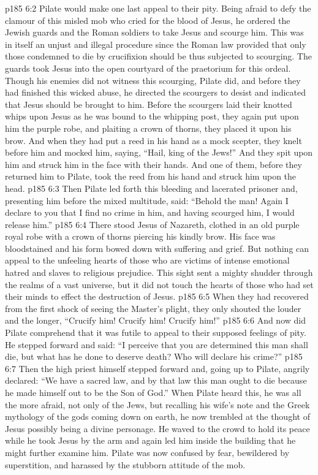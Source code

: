 \vs p185 6:2 Pilate would make one last appeal to their pity. Being afraid to defy the clamour of this misled mob who cried for the blood of Jesus, he ordered the Jewish guards and the Roman soldiers to take Jesus and scourge him. This was in itself an unjust and illegal procedure since the Roman law provided that only those condemned to die by crucifixion should be thus subjected to scourging. The guards took Jesus into the open courtyard of the praetorium for this ordeal. Though his enemies did not witness this scourging, Pilate did, and before they had finished this wicked abuse, he directed the scourgers to desist and indicated that Jesus should be brought to him. Before the scourgers laid their knotted whips upon Jesus as he was bound to the whipping post, they again put upon him the purple robe, and plaiting a crown of thorns, they placed it upon his brow. And when they had put a reed in his hand as a mock scepter, they knelt before him and mocked him, saying, “Hail, king of the Jews!” And they spit upon him and struck him in the face with their hands. And one of them, before they returned him to Pilate, took the reed from his hand and struck him upon the head.
\vs p185 6:3 Then Pilate led forth this bleeding and lacerated prisoner and, presenting him before the mixed multitude, said: “Behold the man! Again I declare to you that I find no crime in him, and having scourged him, I would release him.”
\vs p185 6:4 There stood Jesus of Nazareth, clothed in an old purple royal robe with a crown of thorns piercing his kindly brow. His face was bloodstained and his form bowed down with suffering and grief. But nothing can appeal to the unfeeling hearts of those who are victims of intense emotional hatred and slaves to religious prejudice. This sight sent a mighty shudder through the realms of a vast universe, but it did not touch the hearts of those who had set their minds to effect the destruction of Jesus.
\vs p185 6:5 When they had recovered from the first shock of seeing the Master’s plight, they only shouted the louder and the longer, “Crucify him! Crucify him! Crucify him!”
\vs p185 6:6 And now did Pilate comprehend that it was futile to appeal to their supposed feelings of pity. He stepped forward and said: “I perceive that you are determined this man shall die, but what has he done to deserve death? Who will declare his crime?”
\vs p185 6:7 Then the high priest himself stepped forward and, going up to Pilate, angrily declared: “We have a sacred law, and by that law this man ought to die because he made himself out to be the Son of God.” When Pilate heard this, he was all the more afraid, not only of the Jews, but recalling his wife’s note and the Greek mythology of the gods coming down on earth, he now trembled at the thought of Jesus possibly being a divine personage. He waved to the crowd to hold its peace while he took Jesus by the arm and again led him inside the building that he might further examine him. Pilate was now confused by fear, bewildered by superstition, and harassed by the stubborn attitude of the mob.
